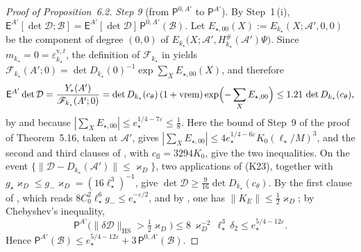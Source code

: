 \documentclass[11pt]{amsart}
\theoremstyle{definition}
\begin{document}
\begin{proof}[Proof of Proposition~6.2]
\emph{Step 9} (from $\mathsf P^{0,A'}$ to $\mathsf P^{A'}$).
By Step~1\,(i), $\mathsf E^{A'}[\det\mathcal D;\mathcal B]=\allowbreak \mathsf E^{A'}[\det\mathcal D]\,\allowbreak \mathsf P^{0,A'}(\mathcal B)$.
Let $E_{\star,00}(X):=E_{k_\star}(X;\mathscr A',0,0)$ be the component of degree $(0,0)$ of $E_{k_\star}\bigl(X;\mathscr A',\allowbreak H^\#_{k_\star}(\mathscr A')\Psi\bigr)$.
Since $m_{k_\star}=0=\varepsilon^{\mathrm v,t}_{k_\star}$, the definition of $\mathscr F_{k_\star}$ in \cite[Section~I.5.7]{QEDIII} yields $\mathscr F_{k_\star}(A';0)=\allowbreak \det D_{k_\star}(0)^{-1}\exp\sum_XE_{\star,00}(X)$, and therefore
\begin{equation*}
\mathsf E^{A'}\det\mathcal D=\frac{Y_*(A')}{\mathscr F_{k_\star}(A';0)}=\det D_{k_\star}(c_\theta)\,(1+\mathrm{vrem})\exp\Bigl(-\sum_XE_{\star,00}\Bigr)\le1.21\,\det D_{k_\star}(c_\theta),
\end{equation*}
by \cite[Proposition~30.3\,(f)]{QEDIII} and because $|\sum_XE_{\star,00}|\le e_\star^{1/4-7\varepsilon}\le\frac18$.
Here the bound of Step~9 of the proof of Theorem~5.16, taken at $\mathscr A'$, gives $|\sum_XE_{\star,00}|\le4e_\star^{1/4-6\varepsilon}K_0(\ell_\star/M)^3$, and the second and third clauses of \cite[(T2)]{QEDIII}, with $c_{\mathrm{fl}}=3294K_0$, give the two inequalities.
On the event $\{\|\mathcal D-D_{k_\star}(\mathscr A')\|\le\varkappa_D\}$, two applications of (K23), together with $g_\star\varkappa_D\le g_-\varkappa_D=(16\ell_\star^3)^{-1}$, give $\det\mathcal D\ge\frac9{16}\det D_{k_\star}(c_\theta)$.
By the first clause of \cite[(T2)]{QEDIII}, which reads $8C_0^2\ell_\star^6g_-\le e_\star^{-\varepsilon/2}$, and by \cite[(fl)]{QEDIII}, one has $\|K_E\|\le\frac12\varkappa_D$;
by Chebyshev's inequality,
\begin{equation*}
\mathsf P^{A'}\bigl(\|\delta\mathcal D\|_{\mathrm{HS}}>\tfrac12\varkappa_D\bigr)\le8\,\varkappa_D^{-2}\,\ell_\star^3\,\delta_2\le e_\star^{5/4-12\varepsilon}.
\end{equation*}
Hence $\mathsf P^{A'}(\mathcal B)\le e_\star^{5/4-12\varepsilon}+3\,\allowbreak \mathsf P^{0,A'}(\mathcal B)$.


\end{proof}
\end{document}
